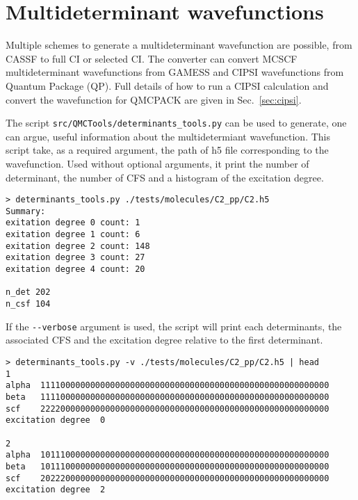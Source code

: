 \section{Multideterminant wavefunctions}
\label{sec:multideterminants}
Multiple schemes to generate a multideterminant wavefunction are
possible, from CASSF to full CI or selected CI. The \qmcpack converter can
convert MCSCF multideterminant wavefunctions from
GAMESS\cite{schmidt93} and CIPSI\cite{Caffarel2013} wavefunctions from
Quantum Package\cite{QP} (QP). Full details of how to run a CIPSI
calculation and convert the wavefunction for QMCPACK are given in 
Sec.~\ref{sec:cipsi}.

The script \verb|src/QMCTools/determinants_tools.py| can be used to generate, one can argue,
useful information about the multidetermiant wavefunction. This script take, as a required argument, the path of h5 file corresponding to the wavefunction. Used without optional arguments, it print the number of determinant, the number of CFS and a histogram of the excitation degree.

\begin{lstlisting}[style=SHELL]
> determinants_tools.py ./tests/molecules/C2_pp/C2.h5
Summary:
exitation degree 0 count: 1
exitation degree 1 count: 6
exitation degree 2 count: 148
exitation degree 3 count: 27
exitation degree 4 count: 20

n_det 202
n_csf 104
\end{lstlisting}

If the \verb|--verbose| argument is used, the script will print each determinants,
the associated CFS and the excitation degree relative to the first determinant.
\begin{lstlisting}[style=SHELL]
> determinants_tools.py -v ./tests/molecules/C2_pp/C2.h5 | head
1
alpha  1111000000000000000000000000000000000000000000000000000000
beta   1111000000000000000000000000000000000000000000000000000000
scf    2222000000000000000000000000000000000000000000000000000000
excitation degree  0

2
alpha  1011100000000000000000000000000000000000000000000000000000
beta   1011100000000000000000000000000000000000000000000000000000
scf    2022200000000000000000000000000000000000000000000000000000
excitation degree  2
\end{lstlisting}
